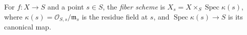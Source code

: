 
For $f:X\to S$ and a point $s\in S$, the \emph{fiber scheme} is $X_s=X\times_S\operatorname{Spec}\kappa(s)$, where $\kappa(s)=\mathcal O_{S,s}/\mathfrak m_s$ is the residue field at $s$, and $\operatorname{Spec}\kappa(s)\to S$ is its canonical map.
